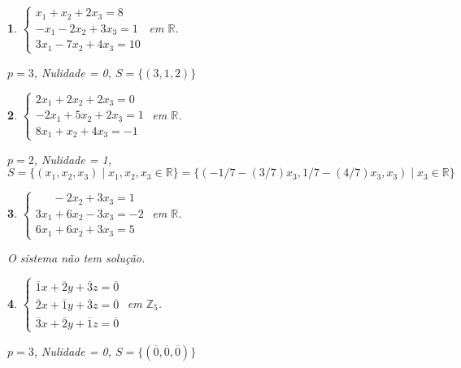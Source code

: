 \documentclass[12pt]{exam}
\newtheorem{exercicio}{}
\newcommand{\integer}{\mathbb{Z}}
\newcommand{\real}{\mathbb{R}}
\begin{document}
\begin{exercicio}
$\begin{cases}
  x_1 + x_2 + 2x_3 = 8\\
  -x_1 - 2x_2 + 3x_3 = 1\\
  3x_1 - 7x_2 + 4x_3 = 10
\end{cases}$ em $\real$.
\begin{solucao}
  $p = 3$, Nulidade = 0, $S = \{(3, 1, 2)\}$
\end{solucao}
\end{exercicio}

\begin{exercicio}
$\begin{cases}
  2x_1 + 2x_2 + 2x_3 = 0\\
  -2x_1 + 5x_2 + 2x_3 = 1\\
  8x_1 + x_2 + 4x_3 = -1
\end{cases}$ em $\real$.
\begin{solucao}
  $p = 2$, Nulidade = 1, $S = \{(x_1, x_2, x_3) \mid x_1, x_2, x_3 \in \real\} = \{(-1/7 - (3/7)x_3, 1/7 - (4/7)x_3, x_3) \mid x_3 \in \real\}$
\end{solucao}
\end{exercicio}

\begin{exercicio}
$\begin{cases}
  \phantom{2x_1} - 2x_2 + 3x_3 = 1\\
  3x_1 + 6x_2 - 3x_3 = -2\\
  6x_1 + 6x_2 + 3x_3 = 5
\end{cases}$ em $\real$.
\begin{solucao}
  O sistema n\~ao tem solu\c{c}\~ao.
\end{solucao}
\end{exercicio}

\begin{exercicio}
$\begin{cases}
  \overline{1}x + \overline{2}y + \overline{3}z = \overline{0}\\
  \overline{2}x + \overline{1}y + \overline{3}z = \overline{0}\\
  \overline{3}x + \overline{2}y + \overline{1}z = \overline{0}
\end{cases}$ em $\integer_5$.
\begin{solucao}
  $p = 3$, Nulidade = 0, $S = \{(\overline{0},\overline{0},\overline{0})\}$
\end{solucao}
\end{exercicio}
\end{document}
